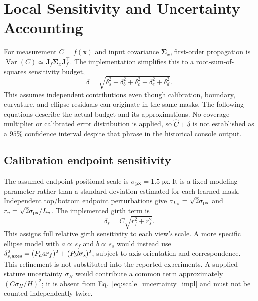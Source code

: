 \documentclass[11pt,a4paper]{article}
\numberwithin{equation}{section}
\begin{document}
\section{Local Sensitivity and Uncertainty Accounting}
\label{subsec:uncertainty_budget}
For measurement $C=f(\mathbf x)$ and input covariance $\mathbf\Sigma_x$, first-order propagation is $\operatorname{Var}(C)\simeq\mathbf J_f\mathbf\Sigma_x\mathbf J_f^\top$. The implementation simplifies this to a root-sum-of-squares sensitivity budget,
\begin{equation}
\delta=\sqrt{\delta_s^2+\delta_b^2+\delta_c^2+\delta_e^2+\delta_d^2}.
\label{eq:total_quadrature}
\end{equation}
This assumes independent contributions even though calibration, boundary, curvature, and ellipse residuals can originate in the same masks. The following equations describe the actual budget and its approximations. No coverage multiplier or calibrated error distribution is applied, so $\hat C\pm\delta$ is not established as a $95\%$ confidence interval despite that phrase in the historical console output.

\subsection{Calibration endpoint sensitivity}
The assumed endpoint positional scale is $\sigma_{\rm px}=1.5$\,px. It is a fixed modeling parameter rather than a standard deviation estimated for each learned mask. Independent top/bottom endpoint perturbations give $\sigma_{L_v}=\sqrt2\sigma_{\rm px}$ and $r_v=\sqrt2\sigma_{\rm px}/L_v$. The implemented girth term is
\begin{equation}
\delta_s=C\sqrt{r_f^2+r_s^2}.
\label{eq:scale_uncertainty_impl}
\end{equation}
This assigns full relative girth sensitivity to each view's scale. A more specific ellipse model with $a\propto s_f$ and $b\propto s_s$ would instead use $\delta_{s,\rm axes}^2=(P_a a r_f)^2+(P_b b r_s)^2$, subject to axis orientation and correspondence. This refinement is not substituted into the reported experiments. A supplied-stature uncertainty $\sigma_H$ would contribute a common term approximately $(C\sigma_H/H)^2$; it is absent from Eq.~\eqref{eq:scale_uncertainty_impl} and must not be counted independently twice.
\end{document}
